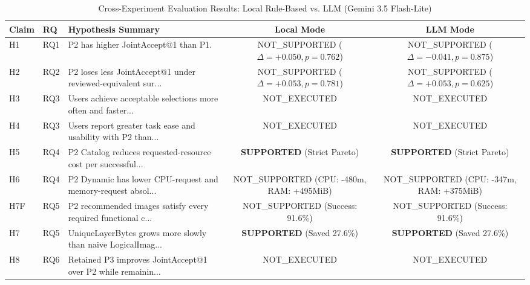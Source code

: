 \begin{table}[htbp]
\centering
\caption{Cross-Experiment Evaluation Results: Local Rule-Based vs. LLM (Gemini 3.5 Flash-Lite)}
\label{tab:thesis_results_comparison}
\begin{tabular}{lllcc}
\hline
\textbf{Claim} & \textbf{RQ} & \textbf{Hypothesis Summary} & \textbf{Local Mode} & \textbf{LLM Mode} \\
\hline
H1 & RQ1 & P2 has higher JointAccept@1 than P1. & NOT\_SUPPORTED ($\Delta=+0.050, p=0.762$) & NOT\_SUPPORTED ($\Delta=-0.041, p=0.875$) \\
H2 & RQ2 & P2 loses less JointAccept@1 under reviewed-equivalent sur... & NOT\_SUPPORTED ($\Delta=+0.053, p=0.781$) & NOT\_SUPPORTED ($\Delta=+0.053, p=0.625$) \\
H3 & RQ3 & Users achieve acceptable selections more often and faster... & NOT\_EXECUTED & NOT\_EXECUTED \\
H4 & RQ3 & Users report greater task ease and usability with P2 than... & NOT\_EXECUTED & NOT\_EXECUTED \\
H5 & RQ4 & P2 Catalog reduces requested-resource cost per successful... & \textbf{SUPPORTED} (Strict Pareto) & \textbf{SUPPORTED} (Strict Pareto) \\
H6 & RQ4 & P2 Dynamic has lower CPU-request and memory-request absol... & NOT\_SUPPORTED (CPU: -480m, RAM: +495MiB) & NOT\_SUPPORTED (CPU: -347m, RAM: +375MiB) \\
H7F & RQ5 & P2 recommended images satisfy every required functional c... & NOT\_SUPPORTED (Success: 91.6\%) & NOT\_SUPPORTED (Success: 91.6\%) \\
H7 & RQ5 & UniqueLayerBytes grows more slowly than naive LogicalImag... & \textbf{SUPPORTED} (Saved 27.6\%) & \textbf{SUPPORTED} (Saved 27.6\%) \\
H8 & RQ6 & Retained P3 improves JointAccept@1 over P2 while remainin... & NOT\_EXECUTED & NOT\_EXECUTED \\
\hline
\end{tabular}
\end{table}
